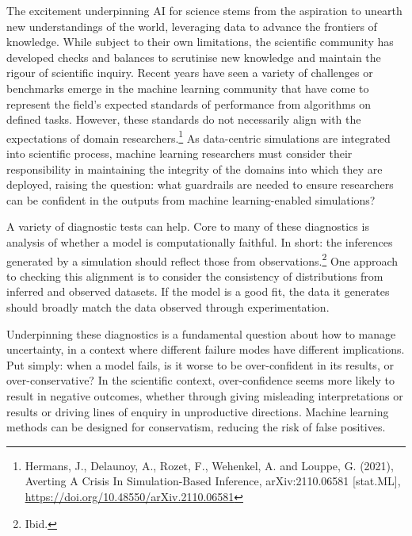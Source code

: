 The excitement underpinning AI for science stems from the aspiration to
unearth new understandings of the world, leveraging data to advance the
frontiers of knowledge. While subject to their own limitations, the
scientific community has developed checks and balances to scrutinise new
knowledge and maintain the rigour of scientific inquiry. Recent years
have seen a variety of challenges or benchmarks emerge in the machine
learning community that have come to represent the field's expected
standards of performance from algorithms on defined tasks. However,
these standards do not necessarily align with the expectations of domain
researchers.\footnote{Hermans, J., Delaunoy, A., Rozet, F., Wehenkel, A.
  and Louppe, G. (2021), Averting A Crisis In Simulation-Based
  Inference, arXiv:2110.06581 {[}stat.ML{]},
  \href{https://doi.org/10.48550/arXiv.2110.06581}{\uline{https://doi.org/10.48550/arXiv.2110.06581}}}
As data-centric simulations are integrated into scientific process,
machine learning researchers must consider their responsibility in
maintaining the integrity of the domains into which they are deployed,
raising the question: what guardrails are needed to ensure researchers
can be confident in the outputs from machine learning-enabled
simulations?

A variety of diagnostic tests can help. Core to many of these
diagnostics is analysis of whether a model is computationally faithful.
In short: the inferences generated by a simulation should reflect those
from observations.\footnote{Ibid.} One approach to checking this
alignment is to consider the consistency of distributions from inferred
and observed datasets. If the model is a good fit, the data it generates
should broadly match the data observed through experimentation.

Underpinning these diagnostics is a fundamental question about how to
manage uncertainty, in a context where different failure modes have
different implications. Put simply: when a model fails, is it worse to
be over-confident in its results, or over-conservative? In the
scientific context, over-confidence seems more likely to result in
negative outcomes, whether through giving misleading interpretations or
results or driving lines of enquiry in unproductive directions. Machine
learning methods can be designed for conservatism, reducing the risk of
false positives.

